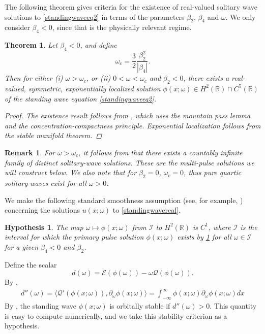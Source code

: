 \documentclass[12pt]{article}
\def\R{{\mathbb R}}
\def\calE{{\mathcal E}}
\def\calQ{{\mathcal Q}}
\def\calI{{\mathcal I}}
\newtheorem{theorem}{Theorem}
\newtheorem{hypothesis}{Hypothesis}
\newtheorem{remark}{Remark}
\begin{document}
The following theorem gives criteria for the existence of real-valued solitary wave solutions to \cref{standingwaveeq2} in terms of the parameters $\beta_2$, $\beta_4$ and $\omega$. We only consider $\beta_4 < 0$, since that is the physically relevant regime.

\begin{theorem}\label{theorem:solitonexist}
Let $\beta_4 < 0$, and define
\begin{equation}\label{omegac}
\omega_c = \frac{3}{2} \frac{\beta_2^2}{|\beta_4|}.
\end{equation}
Then for either (i) $\omega > \omega_c$, or (ii) $0 < \omega < \omega_c$ and $\beta_2 < 0$, 
there exists a real-valued, symmetric, exponentially localized solution $\phi(x; \omega) \in H^2(\R) \cap C^5(\R)$ of the standing wave equation \cref{standingwaveeq2}. 
\begin{proof}
The existence result follows from \cite{Groves1998}, which uses the mountain pass lemma and the concentration-compactness principle. Exponential localization follows from the stable manifold theorem.
\end{proof}
\end{theorem}

\begin{remark}
For $\omega > \omega_c$, it follows from \cite{Groves1998} that there exists a countably infinite family of distinct solitary-wave solutions. These are the multi-pulse solutions we will construct below. We also note that for $\beta_2 = 0$, $\omega_c = 0$, thus pure quartic solitary waves exist for all $\omega > 0$.
\end{remark}

We make the following standard smoothness assumption (see, for example, \cite[Assumption 2]{Grillakis1987}) concerning the solutions $u(x; \omega)$ to \cref{standingwavereal}.

\begin{hypothesis}\label{hyp:smoothmap}
The map $\omega \mapsto \phi(x; \omega)$ from $\calI$ to $H^2(\R)$ is $C^1$, where $\calI$ is the interval for which the primary pulse solution $\phi(x; \omega)$ exists by \cref{theorem:solitonexist} for all $\omega \in \calI$ for a given $\beta_4 < 0$ and $\beta_2$.
\end{hypothesis}

Define the scalar
\begin{equation}
d(\omega) = \calE(\phi(\omega)) - \omega\calQ(\phi(\omega)).
\end{equation}
By \cite[(2.21)]{Grillakis1987},
\begin{align}\label{ddoubleprime}
d''(\omega) = \langle \calQ'(\phi(x; \omega)), \partial_\omega \phi(x; \omega) \rangle
= \int_{-\infty}^\infty \phi(x; \omega) \partial_\omega \phi(x; \omega) dx
\end{align}
By \cite[Theorem 3.5]{Grillakis1987}, the standing wave $\phi(x; \omega)$ is orbitally stable if $d''(\omega) > 0$. This quantity is easy to compute numerically, and we take this stability criterion as a hypothesis.
\end{document}
